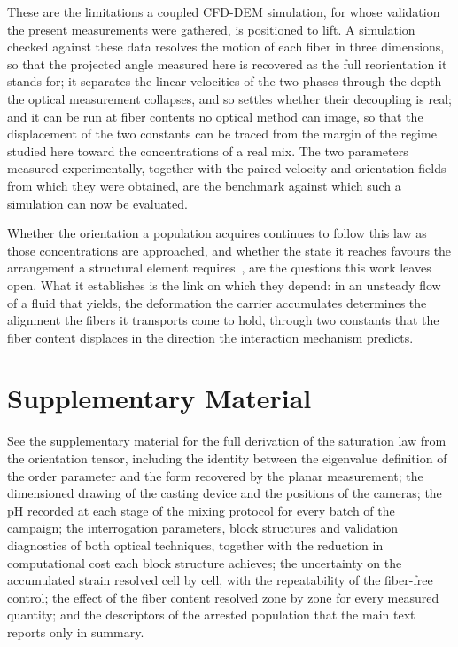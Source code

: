 \documentclass[%
  aip,
  pof,          %
  reprint,      %
  floatfix
]{revtex4-2}
\begin{document}
These are the limitations a coupled CFD-DEM simulation, for whose validation the present measurements were gathered, is positioned to lift. A simulation checked against these data resolves the motion of each fiber in three dimensions, so that the projected angle measured here is recovered as the full reorientation it stands for; it separates the linear velocities of the two phases through the depth the optical measurement collapses, and so settles whether their decoupling is real; and it can be run at fiber contents no optical method can image, so that the displacement of the two constants can be traced from the margin of the regime studied here toward the concentrations of a real mix. The two parameters measured experimentally, together with the paired velocity and orientation fields from which they were obtained, are the benchmark against which such a simulation can now be evaluated.

Whether the orientation a population acquires continues to follow this law as those concentrations are approached, and whether the state it reaches favours the arrangement a structural element requires~\cite{kang2011tensile,abrishambaf2017influence}, are the questions this work leaves open. What it establishes is the link on which they depend: in an unsteady flow of a fluid that yields, the deformation the carrier accumulates determines the alignment the fibers it transports come to hold, through two constants that the fiber content displaces in the direction the interaction mechanism predicts.

\section*{Supplementary Material}

See the supplementary material for the full derivation of the saturation law from the orientation tensor, including the identity between the eigenvalue definition of the order parameter and the form recovered by the planar measurement; the dimensioned drawing of the casting device and the positions of the cameras; the pH recorded at each stage of the mixing protocol for every batch of the campaign; the interrogation parameters, block structures and validation diagnostics of both optical techniques, together with the reduction in computational cost each block structure achieves; the uncertainty on the accumulated strain resolved cell by cell, with the repeatability of the fiber-free control; the effect of the fiber content resolved zone by zone for every measured quantity; and the descriptors of the arrested population that the main text reports only in summary.
\end{document}
